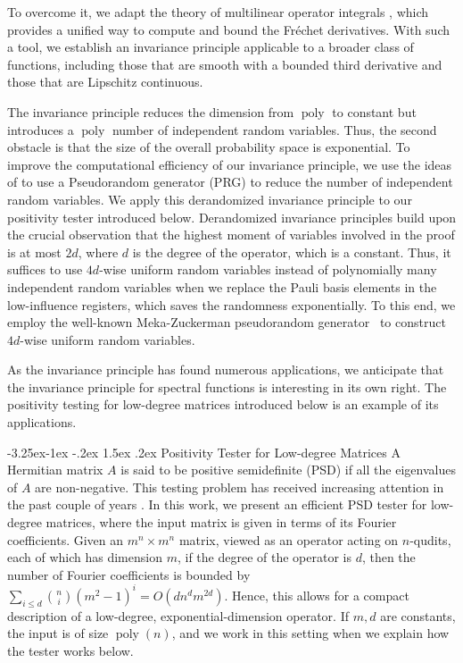 \documentclass[10pt,a4paper]{article}
\makeatletter
\renewcommand{\subsubsection}{\@startsection{subsubsection}{2}{\z@}%
             {-3.25ex\@plus -1ex \@minus -.2ex}%
             {1.5ex \@plus .2ex}%
             {\normalfont\normalsize\scshape\bfseries}}
\theoremstyle{plain}
\theoremstyle{definition}
\newcommand{\poly} {\ensuremath{\operatorname{poly}}}
\newcommand{\1}{\mathbb{1}} %
\makeatother
\begin{document}
To overcome it, we adapt the theory of multilinear operator integrals \cite{skripka2019multilinear}, which provides a unified way to compute and bound the Fr\'echet derivatives. With such a tool, we establish an invariance principle applicable to a broader class of functions, including those that are smooth with a bounded third derivative and those that are Lipschitz continuous.



The invariance principle reduces the dimension from $\poly$ to constant but introduces a $\poly$ number of independent random variables. Thus, the second obstacle is that the size of the overall probability space is exponential.  
To improve the computational efficiency of our invariance principle, we use the ideas of \cite{10.1145/1806689.1806749,10.1145/2395116.2395118,10.1145/3460532} to use a Pseudorandom generator (PRG) to reduce the number of independent random variables. We apply this derandomized invariance principle to our positivity tester introduced below.
Derandomized invariance principles build upon the crucial observation that the highest moment of variables involved in the proof is at most $2d$, where $d$ is the degree of the operator, which is a constant.
Thus, it suffices to use $4d$-wise uniform random variables instead of polynomially many independent random variables when we replace the Pauli basis elements in the low-influence registers, which saves the randomness exponentially. To this end, we employ the well-known Meka-Zuckerman pseudorandom generator~\cite{10.1145/1806689.1806749} to construct $4d$-wise uniform random variables.


As the invariance principle has found numerous applications, we anticipate that the invariance principle for spectral functions is interesting in its own right. The positivity testing for low-degree matrices introduced below is an example of its applications.



\subsubsection{Positivity Tester for Low-degree Matrices} A Hermitian matrix $A$ is said to be positive semidefinite (PSD) if all the eigenvalues of $A$ are non-negative. This testing problem has received increasing attention in the past couple of years \cite{10.5555/644108.644112,han2017approximating,bakshi2020testing,9996743}. In this work, we present an efficient PSD tester for low-degree matrices, where the input matrix is given in terms of its Fourier coefficients. Given an $m^n\times m^n$ matrix, viewed as an operator acting on $n$-qudits, each of which has dimension $m$, if the degree of the operator is $d$, then the number of Fourier coefficients is bounded by $\sum_{i\le d}\binom{n}{i}(m^2-1)^i=O(dn^dm^{2d})$. Hence, this allows for a compact description of a low-degree, exponential-dimension operator.
If $m, d$ are constants, the input is of size $\poly(n)$, and we work in this setting when we explain how the tester works below.
\end{document}
